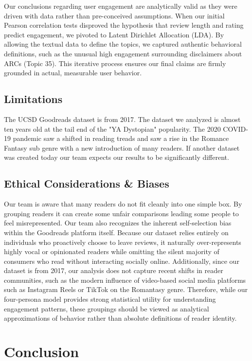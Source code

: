 \documentclass[conference]{IEEEtran}
\begin{document}
Our conclusions regarding user engagement are analytically valid as they were driven with data rather than pre-conceived assumptions. When our initial Pearson correlation tests disproved the hypothesis that review length and rating predict engagement, we pivoted to Latent Dirichlet Allocation (LDA). By allowing the textual data to define the topics, we captured authentic behavioral definitions, such as the unusual high engagement surrounding disclaimers about ARCs (Topic 35). This iterative process ensures our final claims are firmly grounded in actual, measurable user behavior.

\subsection{Limitations}

The UCSD Goodreads dataset is from 2017. The dataset we analyzed is almost ten years old at the tail end of the "YA Dystopian" popularity. The 2020 COVID-19 pandemic saw a shifted in reading treads and saw a rise in the Romance Fantasy sub genre with a new introduction of many readers. If another dataset was created today our team expects our results to be significantly different.

\subsection{Ethical Considerations \& Biases}

Our team is aware that many readers do not fit cleanly into one simple box. By grouping readers it can create some unfair comparisons leading some people to feel misrepresented. Our team also recognizes the inherent self-selection bias within the Goodreads platform itself. Because our dataset relies entirely on individuals who proactively choose to leave reviews, it naturally over-represents highly vocal or opinionated readers while omitting the silent majority of consumers who read without interacting socially online. Additionally, since our dataset is from 2017, our analysis does not capture recent shifts in reader communities, such as the modern influence of video-based social media platforms such as Instagram Reels or TikTok on the Romantasy genre. Therefore, while our four-persona model provides strong statistical utility for understanding engagement patterns, these groupings should be viewed as analytical approximations of behavior rather than absolute definitions of reader identity.

\section{Conclusion}
\end{document}
